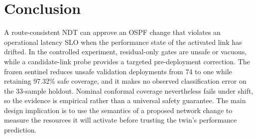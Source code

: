 \section{Conclusion}

A route-consistent NDT can approve an OSPF change that violates an operational latency SLO when the performance state of the activated link has drifted. In the controlled experiment, residual-only gates are unsafe or vacuous, while a candidate-link probe provides a targeted pre-deployment correction. The frozen sentinel reduces unsafe validation deployments from 74 to one while retaining 97.32\% safe coverage, and it makes no observed classification error on the 33-sample holdout. Nominal conformal coverage nevertheless fails under shift, so the evidence is empirical rather than a universal safety guarantee. The main design implication is to use the semantics of a proposed network change to measure the resources it will activate before trusting the twin's performance prediction.
